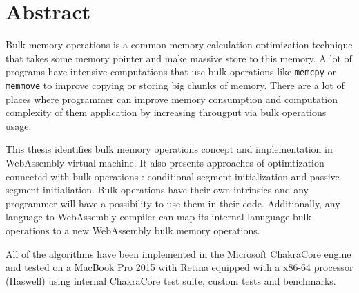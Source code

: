 \chapter*{Abstract}
 
Bulk memory operations is a common memory calculation optimization technique that takes some memory pointer and make massive store to this memory. A lot of programs have intensive computations that use bulk operations like \texttt{memcpy} or \texttt{memmove} to improve copying or storing big chunks of memory. There are a lot of places where programmer can improve memory consumption and computation complexity of them application by increasing througput via bulk operations usage.

This thesis identifies bulk memory operations concept and implementation in WebAssembly virtual machine. It also presents approaches of optimtization connected with bulk operations : conditional segment initialization and passive segment initialiation. Bulk operations have their own intrinsics and any programmer will have a possibility to use them in their code. Additionally, any language-to-WebAssembly compiler can map its internal lanuguage bulk operations to a new WebAssembly bulk memory operations.   

All of the algorithms have been implemented in the Microsoft ChakraCore engine and tested on a MacBook Pro 2015 with Retina equipped with a x86-64 processor (Haswell) using internal ChakraCore test suite, custom tests and benchmarks.  